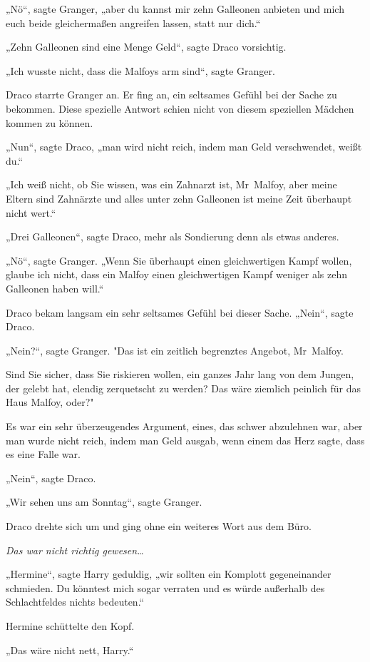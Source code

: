 {„Nö“, sagte Granger, „aber du kannst mir zehn Galleonen anbieten und mich euch beide gleichermaßen angreifen lassen, statt nur dich.“

„Zehn Galleonen sind eine Menge Geld“, sagte Draco vorsichtig.

„Ich wusste nicht, dass die Malfoys arm sind“, sagte Granger.

Draco starrte Granger an. Er fing an, ein seltsames Gefühl bei der Sache zu bekommen. Diese spezielle Antwort schien nicht von diesem speziellen Mädchen kommen zu können.

„Nun“, sagte Draco, „man wird nicht reich, indem man Geld verschwendet, weißt du.“

„Ich weiß nicht, ob Sie wissen, was ein Zahnarzt ist, Mr~Malfoy, aber meine Eltern sind Zahnärzte und alles unter zehn Galleonen ist meine Zeit überhaupt nicht wert.“

„Drei Galleonen“, sagte Draco, mehr als Sondierung denn als etwas anderes.

„Nö“, sagte Granger. „Wenn Sie überhaupt einen gleichwertigen Kampf wollen, glaube ich nicht, dass ein Malfoy einen gleichwertigen Kampf weniger als zehn Galleonen haben will.“

Draco bekam langsam ein sehr seltsames Gefühl bei dieser Sache. „Nein“, sagte Draco.

„Nein?“, sagte Granger. "Das ist ein zeitlich begrenztes Angebot, Mr~Malfoy.

Sind Sie sicher, dass Sie riskieren wollen, ein ganzes Jahr lang von dem Jungen, der gelebt hat, elendig zerquetscht zu werden? Das wäre ziemlich peinlich für das Haus Malfoy, oder?"

Es war ein sehr überzeugendes Argument, eines, das schwer abzulehnen war, aber man wurde nicht reich, indem man Geld ausgab, wenn einem das Herz sagte, dass es eine Falle war.

„Nein“, sagte Draco.

„Wir sehen uns am Sonntag“, sagte Granger.

Draco drehte sich um und ging ohne ein weiteres Wort aus dem Büro.

\emph{Das war nicht richtig gewesen…}

„Hermine“, sagte Harry geduldig, „wir sollten ein Komplott gegeneinander schmieden. Du könntest mich sogar verraten und es würde außerhalb des Schlachtfeldes nichts bedeuten.“

Hermine schüttelte den Kopf.

„Das wäre nicht nett, Harry.“

}
